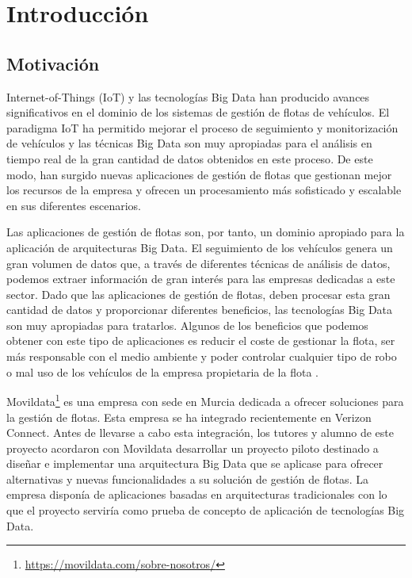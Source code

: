 
\section{Introducción\label{intro}}
\subsection{Motivación\label{motivacion}}
\par
Internet-of-Things (IoT) y las tecnologías Big Data han producido avances significativos en el dominio de los sistemas de gestión de flotas de vehículos. El paradigma IoT ha permitido mejorar el proceso de seguimiento y monitorización de vehículos y las técnicas Big Data son muy apropiadas para el análisis en tiempo real de la gran cantidad de datos obtenidos en este proceso\cite{1-1-3}. De este modo, han surgido nuevas aplicaciones de gestión de flotas que gestionan mejor los recursos de la empresa y ofrecen un procesamiento más sofisticado y escalable en sus diferentes escenarios.
\par
Las aplicaciones de gestión de flotas son, por tanto, un dominio apropiado para la aplicación de arquitecturas Big Data. El seguimiento de los vehículos genera un gran volumen de datos que, a través de diferentes técnicas de análisis de datos, podemos extraer información de gran interés para las empresas dedicadas a este sector. Dado que las aplicaciones de gestión de flotas, deben procesar esta gran cantidad de datos y proporcionar diferentes beneficios, las tecnologías Big Data son muy apropiadas para tratarlos. Algunos de los beneficios que podemos obtener con este tipo de aplicaciones es reducir el coste de gestionar la flota, ser más responsable con el medio ambiente y poder controlar cualquier tipo de robo o mal uso de los vehículos de la empresa propietaria de la flota \cite{1-1-1} \cite{1-1-2}.
\par
Movildata\footnote{\url{https://movildata.com/sobre-nosotros/}} es una empresa con sede en Murcia dedicada a ofrecer soluciones para la gestión de flotas. Esta empresa se ha integrado recientemente en Verizon Connect. Antes de llevarse a cabo esta integración, los tutores y alumno de este proyecto acordaron con Movildata desarrollar un proyecto piloto destinado a diseñar e implementar una arquitectura Big Data que se aplicase para ofrecer alternativas y nuevas funcionalidades a su solución de gestión de flotas. La empresa disponía de aplicaciones basadas en arquitecturas tradicionales con lo que el proyecto serviría como prueba de concepto de aplicación de tecnologías Big Data.
\par
